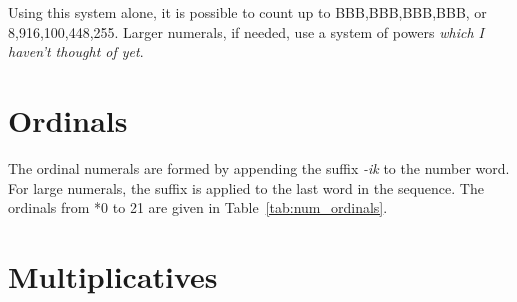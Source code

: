 \documentclass[grammar]{subfiles}
\begin{document}
	Using this system alone, it is possible to count up to BBB,BBB,BBB,BBB\duo, or 8,916,100,448,255\dec. Larger numerals, if needed, use a system of powers \emph{which I haven't thought of yet}.

	\section{Ordinals}
	\label{sec:num_ordinals}
	
	The ordinal numerals are formed by appending the suffix \emph{-ik} to the number word. For large numerals, the suffix is applied to the last word in the sequence. The ordinals from *0 to 21\dec{} are given in Table~\ref{tab:num_ordinals}.

	\begin{table}[htpb]\small\capstart
		\begin{center}
			\qquad
			\caption{Ordinal numerals from 0\dec\ to 21\dec\label{tab:num_ordinals}}
		\end{center}
	\end{table}

	\section{Multiplicatives}
	\label{sec:num_multiplicatives}
\end{document}

